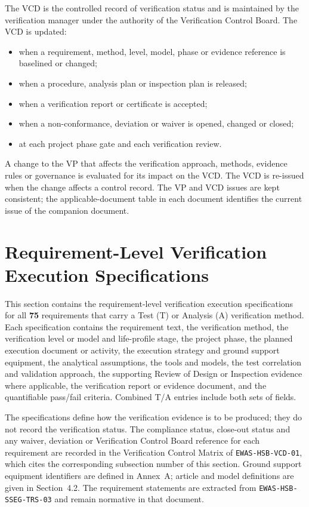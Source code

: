 The VCD is the controlled record of verification status and is maintained by the verification manager under the authority of the Verification Control Board. The VCD is updated:
\begin{itemize}
    \item when a requirement, method, level, model, phase or evidence reference is baselined or changed;
    \item when a procedure, analysis plan or inspection plan is released;
    \item when a verification report or certificate is accepted;
    \item when a non-conformance, deviation or waiver is opened, changed or closed;
    \item at each project phase gate and each verification review.
\end{itemize}

A change to the VP that affects the verification approach, methods, evidence rules or governance is evaluated for its impact on the VCD. The VCD is re-issued when the change affects a control record. The VP and VCD issues are kept consistent; the applicable-document table in each document identifies the current issue of the companion document.


\section{Requirement-Level Verification Execution Specifications}

This section contains the requirement-level verification execution specifications for all \textbf{75} requirements that carry a Test (T) or Analysis (A) verification method. Each specification contains the requirement text, the verification method, the verification level or model and life-profile stage, the project phase, the planned execution document or activity, the execution strategy and ground support equipment, the analytical assumptions, the tools and models, the test correlation and validation approach, the supporting Review of Design or Inspection evidence where applicable, the verification report or evidence document, and the quantifiable pass/fail criteria. Combined T/A entries include both sets of fields.

The specifications define how the verification evidence is to be produced; they do not record the verification status. The compliance status, close-out status and any waiver, deviation or Verification Control Board reference for each requirement are recorded in the Verification Control Matrix of \texttt{EWAS-HSB-VCD-01}, which cites the corresponding subsection number of this section. Ground support equipment identifiers are defined in Annex~A; article and model definitions are given in Section~4.2. The requirement statements are extracted from \texttt{EWAS-HSB-SSEG-TRS-03} and remain normative in that document.

